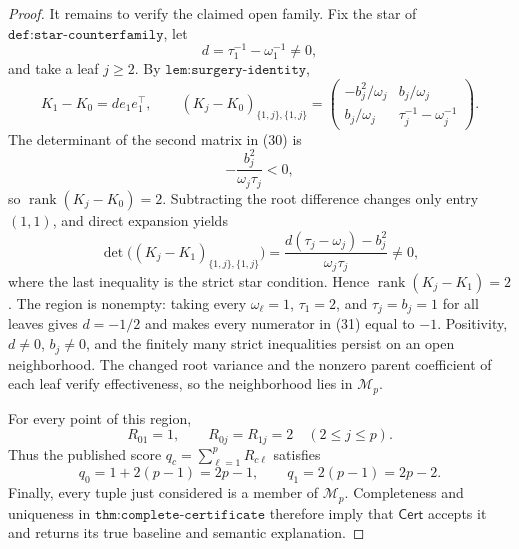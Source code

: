 \documentclass{article}
\begin{document}
\begin{proof}
It remains to verify the claimed open family.  Fix the star of \(\texttt{def:star-counterfamily}\), let
\[
 d=\tau_1^{-1}-\omega_1^{-1}\neq0,
\]
and take a leaf \(j\ge2\).  By \(\texttt{lem:surgery-identity}\),
\[
 K_1-K_0=d e_1e_1^{\top},
 \qquad
 (K_j-K_0)_{\{1,j\},\{1,j\}}
 =\begin{pmatrix}
 -b_j^2/\omega_j&b_j/\omega_j\\
 b_j/\omega_j&\tau_j^{-1}-\omega_j^{-1}
 \end{pmatrix}.                                               \tag{30}
\]
The determinant of the second matrix in (30) is
\[
 -\frac{b_j^2}{\omega_j\tau_j}<0,
\]
so \(\operatorname{rank}(K_j-K_0)=2\).  Subtracting the root difference changes only entry \((1,1)\), and direct expansion yields
\[
 \det\bigl((K_j-K_1)_{\{1,j\},\{1,j\}}\bigr)
 =\frac{d(\tau_j-\omega_j)-b_j^2}{\omega_j\tau_j}\neq0,       \tag{31}
\]
where the last inequality is the strict star condition.  Hence \(\operatorname{rank}(K_j-K_1)=2\).  The region is nonempty: taking every \(\omega_\ell=1\), \(\tau_1=2\), and \(\tau_j=b_j=1\) for all leaves gives \(d=-1/2\) and makes every numerator in (31) equal to \(-1\).  Positivity, \(d\neq0\), \(b_j\neq0\), and the finitely many strict inequalities persist on an open neighborhood.  The changed root variance and the nonzero parent coefficient of each leaf verify effectiveness, so the neighborhood lies in \(\mathcal M_p\).

For every point of this region,
\[
 R_{01}=1,
 \qquad R_{0j}=R_{1j}=2\quad(2\le j\le p).
\]
Thus the published score \(q_c=\sum_{\ell=1}^pR_{c\ell}\) satisfies
\[
 q_0=1+2(p-1)=2p-1,
 \qquad
 q_1=2(p-1)=2p-2.                                           \tag{32}
\]
Finally, every tuple just considered is a member of \(\mathcal M_p\).  Completeness and uniqueness in \(\texttt{thm:complete-certificate}\) therefore imply that \(\mathsf{Cert}\) accepts it and returns its true baseline and semantic explanation.
\end{proof}
\end{document}
